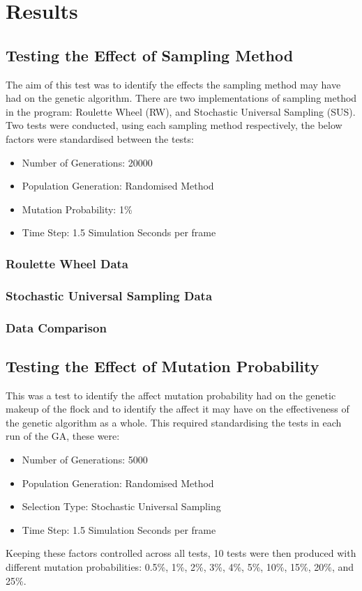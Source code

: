 \section{Results}

\subsection{Testing the Effect of Sampling Method}
The aim of this test was to identify the effects the sampling method may have had on the genetic algorithm. There are two implementations of sampling method in the program: Roulette Wheel (RW), and Stochastic Universal Sampling (SUS).
Two tests were conducted, using each sampling method respectively, the below factors were standardised between the tests:
\begin{itemize}
\item Number of Generations: 20000
\item Population Generation: Randomised Method
\item Mutation Probability: 1\%
\item Time Step: 1.5 Simulation Seconds per frame
\end{itemize}

\subsubsection{Roulette Wheel Data}

\subsubsection{Stochastic Universal Sampling Data}

\subsubsection{Data Comparison}


\subsection{Testing the Effect of Mutation Probability}
This was a test to identify the affect mutation probability had on the genetic makeup of the flock and to identify the affect it may have on the effectiveness of the genetic algorithm as a whole. This required standardising the tests in each run of the GA, these were:
\begin{itemize}
\item Number of Generations: 5000
\item Population Generation: Randomised Method
\item Selection Type: Stochastic Universal Sampling
\item Time Step: 1.5 Simulation Seconds per frame
\end{itemize}
Keeping these factors controlled across all tests, 10 tests were then produced with different mutation probabilities: 0.5\%, 1\%, 2\%, 3\%, 4\%, 5\%, 10\%, 15\%, 20\%, and 25\%.

